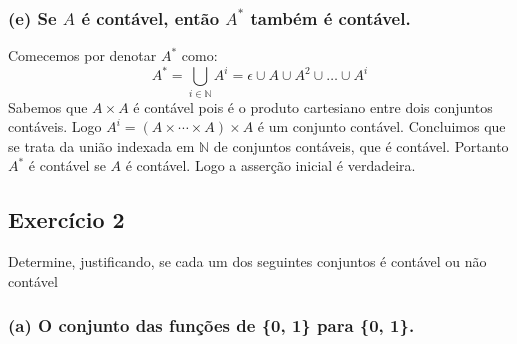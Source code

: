 \documentclass{article}
\begin{document}
\subsubsection*{(e)  Se $A$ é contável, então $A^\ast$ também é contável.}
Comecemos por denotar $A^\ast$ como:
\[
  A^\ast = \bigcup_{i \in \mathbb{N}} A^{i} = \epsilon \cup A \cup A^2 \cup \dots \cup A^{i}
\]
Sabemos que $A \times A$ é contável pois é o produto cartesiano entre dois conjuntos contáveis. Logo $A^i = (A \times \cdots \times A) \times A$ é um conjunto contável. Concluimos que se trata da união indexada em $\mathbb{N}$ de conjuntos contáveis, que é contável. Portanto $A^\ast$ é contável se $A$ é contável. Logo a asserção inicial é verdadeira.

\subsection*{Exercício 2}
Determine, justificando, se cada um dos seguintes conjuntos é contável ou não contável
\subsubsection*{(a) O conjunto das funções de \{0, 1\} para \{0, 1\}.}
\end{document}
